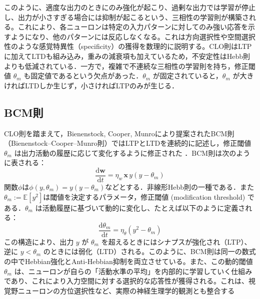 \documentclass[titlepage]{ltjsbook}
\begin{document}
このように、適度な出力のときにのみ強化が起こり、過剰な出力では学習が停止し、出力が小さすぎる場合には抑制が起こるという、三相性の学習則が構築される。これにより、各ニューロンは特定の入力パターンに対してのみ強い応答を示すようになり、他のパターンには反応しなくなる。これは方向選択性や空間選択性のような感覚特異性（specificity）の獲得を数理的に説明する。CLO則はLTPに加えてLTDも組み込み，重みの減衰項も加えているため，不安定性はHebb則よりも低減されている．一方で，複雑で不連続な三相性の学習則を持ち，修正閾値 $\theta_m$ も固定値であるという欠点があった．$\theta_m$ が固定されていると，$\theta_m$ が大きければLTDしか生じず，小さければLTPのみが生じる．

\subsection{BCM則}
CLO則を踏まえて，Bienenstock, Cooper, Munroにより提案されたBCM則（Bienenstock–Cooper–Munro則）ではLTPとLTDを連続的に記述し，修正閾値 $\theta_m$ は出力活動の履歴に応じて変化するように修正された \citep{Bienenstock1982-km,Cooper2012-ec}．BCM則は次のように表される：
\begin{equation}
\frac{\mathrm{d}\mathbf{w}}{\mathrm{d}t} = \eta_w \, \mathbf{x} \, y (y - \theta_m)
\end{equation}
関数$\phi$は$\phi(y, \theta_m)=y(y-\theta_m)$などとする．非線形Hebb則の一種である．また $\theta_m:=\mathbb{E}[y^2]$は閾値を決定するパラメータ，修正閾値 (modification threshold) である．$\theta_m$ は活動履歴に基づいて動的に変化し、たとえば以下のように定義される：
\begin{equation}
\frac{\mathrm{d}\theta_m}{\mathrm{d}t} = \eta_\theta (y^2 - \theta_m)
\end{equation}
この構造により、出力 $y$ が $\theta_m$ を超えるときにはシナプスが強化され（LTP）、逆に $y < \theta_m$ のときには弱化（LTD）される。このように、BCM則は同一の数式の中でHebbian強化とAnti-Hebbian抑制を両立させている。また、この動的閾値 $\theta_m$ は、ニューロンが自らの「活動水準の平均」を内部的に学習していく仕組みであり、これにより入力空間に対する選択的な応答性が獲得される。これは、視覚野ニューロンの方位選択性など、実際の神経生理学的観測とも整合する
\end{document}

